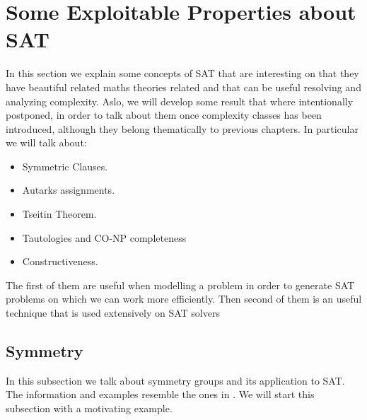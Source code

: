
\section{Some Exploitable Properties about SAT}
In this section we explain some concepts of SAT that are interesting on that they have beautiful related maths theories related and that can be useful resolving and analyzing complexity. Aslo, we will develop some result that where intentionally postponed, in order to talk about them once complexity classes has been introduced, although they belong thematically to previous chapters. In particular we will talk about:
\begin{itemize}
\item Symmetric Clauses. 
\item Autarks assignments.
\item Tseitin Theorem.
\item Tautologies and CO-NP completeness
\item Constructiveness.
\end{itemize}

The first of them are useful when modelling a problem in order to generate SAT problems on which we can work more efficiently. Then second of them is an useful technique that is used extensively on SAT solvers



\subsection{Symmetry}
\label{sub:Symmetry}
In this subsection we talk about symmetry groups and its application to SAT. The information and examples resemble the ones in \cite{sakallah2009symmetry}. We will start this subsection with a motivating example.



